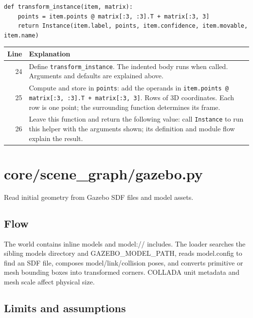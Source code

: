 \documentclass[11pt,a4paper]{book}
\begin{document}
\begin{lstlisting}[firstnumber=24]
def transform_instance(item, matrix):
    points = item.points @ matrix[:3, :3].T + matrix[:3, 3]
    return Instance(item.label, points, item.confidence, item.movable, item.name)
\end{lstlisting}

\begin{longtable}{r p{}}

\textbf{Line} & \textbf{Explanation} \\ \hline \endhead

24 & Define \texttt{transform\_instance}. The indented body runs when called. Arguments and defaults are explained above. \\

25 & Compute and store in \texttt{points}: add the operands in \texttt{item.points @ matrix[:3, :3].T + matrix[:3, 3]}. Rows of 3D coordinates. Each row is one point; the surrounding function determines its frame. \\

26 & Leave this function and return the following value: call \texttt{Instance} to run this helper with the arguments shown; its definition and module flow explain the result. \\

\end{longtable}

\chapter{core/scene\_graph/gazebo.py}

Read initial geometry from Gazebo SDF files and model assets.

\section*{Flow}

The world contains inline models and model:// includes. The loader searches the sibling models directory and GAZEBO\_MODEL\_PATH, reads model.config to find an SDF file, composes model/link/collision poses, and converts primitive or mesh bounding boxes into transformed corners. COLLADA unit metadata and mesh scale affect physical size.

\section*{Limits and assumptions}
\end{document}
